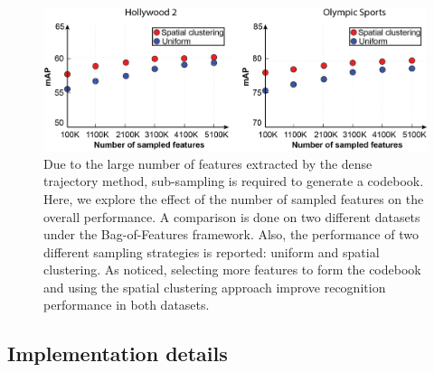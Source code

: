 \documentclass[runningheads]{llncs}
\begin{document}
\begin{figure}[t!]
\begin{center}
\includegraphics[width=0.98\linewidth]{sampling.png}
\end{center}
\vspace{-6pt}\caption{Due to the large number of features extracted by the dense trajectory method, sub-sampling is required to generate a codebook. Here, we explore the effect of the number of sampled features on the overall performance. A comparison is done on two different datasets under the Bag-of-Features framework. Also, the performance of two different sampling strategies is reported: uniform and spatial clustering. As noticed, selecting more features to form the codebook and using the spatial clustering approach improve recognition performance in both datasets.}
\label{fig:feature_sampling}
\end{figure}



\subsection{Implementation details}\label{subsec:implementation}
\end{document}
